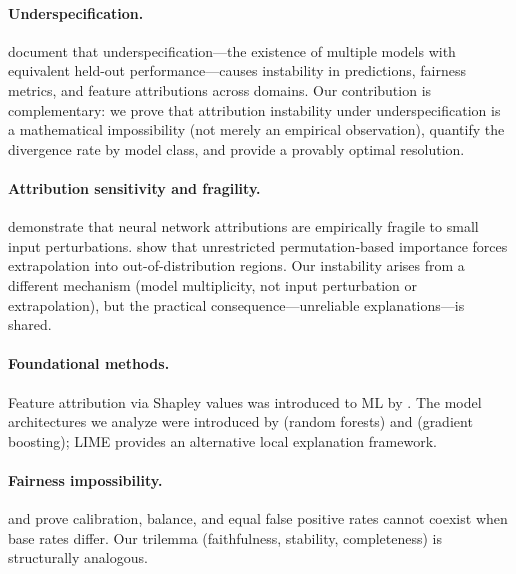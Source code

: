 \documentclass{article}
\begin{document}
\paragraph{Underspecification.}
\citet{damour2022underspecification} document that underspecification---the existence of multiple models with equivalent held-out performance---causes instability in predictions, fairness metrics, and feature attributions across domains. Our contribution is complementary: we prove that attribution instability under underspecification is a mathematical impossibility (not merely an empirical observation), quantify the divergence rate by model class, and provide a provably optimal resolution.

\paragraph{Attribution sensitivity and fragility.}
\citet{ghorbani2019data} demonstrate that neural network attributions are empirically fragile to small input perturbations.
\citet{hooker2021unrestricted} show that unrestricted permutation-based importance forces extrapolation into out-of-distribution regions.
Our instability arises from a different mechanism (model multiplicity, not input perturbation or extrapolation), but the practical consequence---unreliable explanations---is shared.

\paragraph{Foundational methods.}
Feature attribution via Shapley values \citep{shapley1953value} was introduced to ML by \citet{lundberg2017unified}.
The model architectures we analyze were introduced by \citet{breiman2001random} (random forests) and \citet{friedman2001greedy} (gradient boosting); LIME \citep{ribeiro2016should} provides an alternative local explanation framework.

\paragraph{Fairness impossibility.}
\citet{chouldechova2017fair} and \citet{kleinberg2017inherent} prove calibration, balance, and equal false positive rates cannot coexist when base rates differ. Our trilemma (faithfulness, stability, completeness) is structurally analogous.
\end{document}
